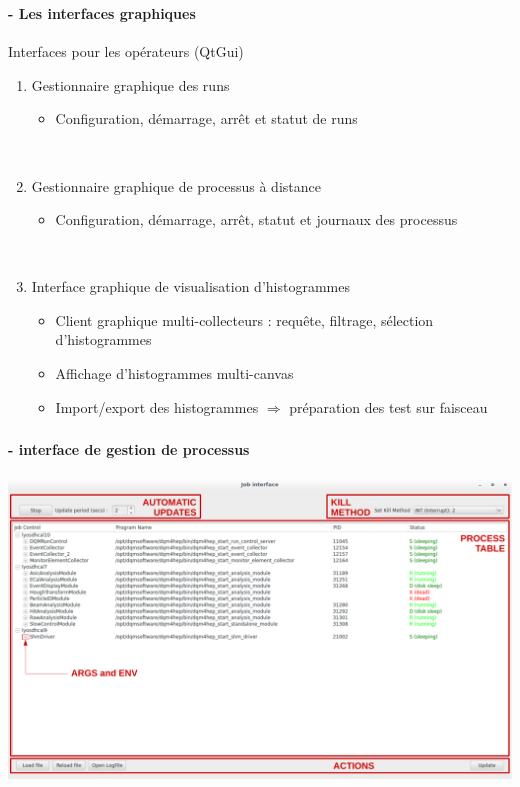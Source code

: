 \documentclass[8pt]{beamer}
\begin{document}
    \begin{frame}
    \frametitle{\secname}
    \framesubtitle{\subsecname - Les interfaces graphiques}
      \begin{block}{Interfaces pour les opérateurs (QtGui)}
        \begin{enumerate}
          \item Gestionnaire graphique des runs
          \begin{itemize}
            \item Configuration, démarrage, arrêt et statut de runs
          \end{itemize}
          ~ \\
          \item Gestionnaire graphique de processus à distance
          \begin{itemize}
            \item Configuration, démarrage, arrêt, statut et journaux des processus
          \end{itemize}
          ~ \\
          \item Interface graphique de visualisation d'histogrammes
          \begin{itemize}
            \item Client graphique multi-collecteurs : requête, filtrage, sélection d'histogrammes
            \item Affichage d'histogrammes multi-canvas
            \item Import/export des histogrammes $\Rightarrow$ préparation des test sur faisceau
          \end{itemize}
        \end{enumerate}
      \end{block}
    \end{frame}

    \begin{frame}
    \frametitle{\secname}
    \framesubtitle{\subsecname - interface de gestion de processus}
      \begin{center}
        \includegraphics[width=\linewidth]{JobControlGui.pdf}
      \end{center}
    \end{frame}
\end{document}
